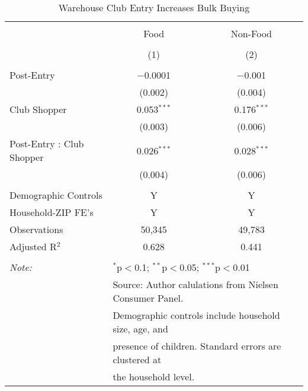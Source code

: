 
\begin{table}[!htbp] \centering 
  \caption{Warehouse Club Entry Increases Bulk Buying} 
  \label{tab:costcoEntry} 
\begin{tabular}{@{\extracolsep{5pt}}lcc} 
\\[-1.8ex]\hline 
\hline \\[-1.8ex] 
 & Food & Non-Food \\ 
\\[-1.8ex] & (1) & (2)\\ 
\hline \\[-1.8ex] 
 Post-Entry & $-$0.0001 & $-$0.001 \\ 
  & (0.002) & (0.004) \\ 
  Club Shopper & 0.053$^{***}$ & 0.176$^{***}$ \\ 
  & (0.003) & (0.006) \\ 
  Post-Entry : Club Shopper & 0.026$^{***}$ & 0.028$^{***}$ \\ 
  & (0.004) & (0.006) \\ 
 \hline \\[-1.8ex] 
Demographic Controls & Y & Y \\ 
Household-ZIP FE's & Y & Y \\ 
Observations & 50,345 & 49,783 \\ 
Adjusted R$^{2}$ & 0.628 & 0.441 \\ 
\hline 
\hline \\[-1.8ex] 
\textit{Note:}  & \multicolumn{2}{l}{$^{*}$p$<$0.1; $^{**}$p$<$0.05; $^{***}$p$<$0.01} \\ 
 & \multicolumn{2}{l}{Source: Author calulations from Nielsen Consumer Panel.} \\ 
 & \multicolumn{2}{l}{Demographic controls include household size, age, and } \\ 
 & \multicolumn{2}{l}{presence of children. Standard errors are clustered at } \\ 
 & \multicolumn{2}{l}{the household level.} \\ 
\end{tabular} 
\end{table} 
